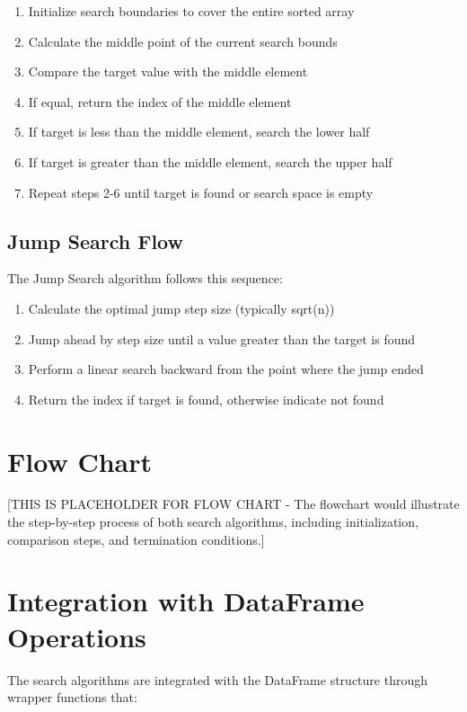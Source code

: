 \begin{enumerate}
    \item Initialize search boundaries to cover the entire sorted array
    \item Calculate the middle point of the current search bounds
    \item Compare the target value with the middle element
    \item If equal, return the index of the middle element
    \item If target is less than the middle element, search the lower half
    \item If target is greater than the middle element, search the upper half
    \item Repeat steps 2-6 until target is found or search space is empty
\end{enumerate}

\subsection{Jump Search Flow}
The Jump Search algorithm follows this sequence:

\begin{enumerate}
    \item Calculate the optimal jump step size (typically sqrt(n))
    \item Jump ahead by step size until a value greater than the target is found
    \item Perform a linear search backward from the point where the jump ended
    \item Return the index if target is found, otherwise indicate not found
\end{enumerate}

\section{Flow Chart}

[THIS IS PLACEHOLDER FOR FLOW CHART - The flowchart would illustrate the step-by-step process of both search algorithms, including initialization, comparison steps, and termination conditions.]

\section{Integration with DataFrame Operations}

The search algorithms are integrated with the DataFrame structure through wrapper functions that:

